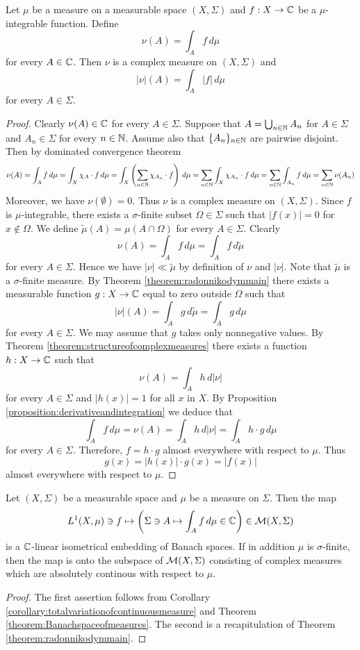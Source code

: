 \begin{corollary}\label{corollary:totalvariationofcontinuousmeasure}
Let $\mu$ be a measure on a measurable space $(X,\Sigma)$ and $f:X\rightarrow {\mathbb C}$ be a $\mu$-integrable function. Define
$$\nu(A) = \int_Af\,d\mu$$
for every $A\in {\mathbb C}$. Then $\nu$ is a complex measure on $(X,\Sigma)$ and
$$|\nu|(A) = \int_A|f|\,d\mu$$
for every $A\in \Sigma$.
\end{corollary}
\begin{proof}
Clearly $\nu(A)\in {\mathbb C}$ for every $A\in \Sigma$. Suppose that $A = \bigcup_{n\in {\mathbb N}}A_n$ for $A\in \Sigma$ and $A_n\in \Sigma$ for every $n\in {\mathbb N}$. Assume also that $\{A_n\}_{n\in {\mathbb N}}$ are pairwise disjoint. Then by dominated convergence theorem
$$\nu(A) = \int_A f\,d\mu = \int_X\chi_A\cdot f\,d\mu = \int_X\left(\sum_{n\in {\mathbb N}}\chi_{A_n}\cdot f\right)\,d\mu = \sum_{n\in {\mathbb N}}\int_X\chi_{A_n}\cdot f\,d\mu = \sum_{n\in {\mathbb N}}\int_{A_n}f\,d\mu = \sum_{n\in {\mathbb N}}\nu(A_n)$$
Moreover, we have $\nu(\emptyset) = 0$. Thus $\nu$ is a complex measure on $(X,\Sigma)$. Since $f$ is $\mu$-integrable, there exists a $\sigma$-finite subset $\Omega\in \Sigma$ such that $|f(x)|= 0$ for $x\not \in \Omega$. We define $\tilde{\mu}(A) = \mu(A\cap \Omega)$ for every $A\in \Sigma$. Clearly
$$\nu(A) = \int_Af\,d\mu = \int_Af\,d\tilde{\mu}$$
for every $A\in \Sigma$. Hence we have $|\nu|\ll\tilde{\mu}$ by definition of $\nu$ and $|\nu|$. Note that $\tilde{\mu}$ is a $\sigma$-finite measure. By Theorem \ref{theorem:radonnikodymmain} there exists a measurable function $g:X\rightarrow {\mathbb C}$ equal to zero outside $\Omega$ such that
$$|\nu|(A) = \int_Ag\,d\tilde{\mu} = \int_Ag\,d\mu$$
for every $A\in \Sigma$. We may assume that $g$ takes only nonnegative values. By Theorem \ref{theorem:structureofcomplexmeasures} there exists a function $h:X\rightarrow {\mathbb C}$ such that
$$\nu(A) = \int_Ah\,d|\nu|$$
for every $A\in \Sigma$ and $|h(x)|=1$ for all $x$ in $X$. By Proposition \ref{proposition:derivativeandintegration} we deduce that
$$\int_Af\,d\mu = \nu(A) = \int_Ah\,d|\nu| = \int_Ah\cdot g\,d\mu$$
for every $A\in \Sigma$. Therefore, $f = h\cdot g$ almost everywhere with respect to $\mu$. Thus
$$g(x) = |h(x)|\cdot g(x) = |f(x)|$$
almost everywhere with respect to $\mu$.
\end{proof}

\begin{corollary}
Let $(X,\Sigma)$ be a measurable space and $\mu$ be a measure on $\Sigma$. Then the map
$$L^1(X,\mu)\ni f\mapsto \left(\Sigma \ni A \mapsto \int_Af\,d\mu\in {\mathbb C}\right)\in {\mathcal M}(X,\Sigma)$$
is a ${\mathbb C}$-linear isometrical embedding of Banach spaces. If in addition $\mu$ is $\sigma$-finite, then the map is onto the subspace of ${\mathcal M}(X,\Sigma)$ consisting of complex measures which are absolutely continous with respect to $\mu$.
\end{corollary}
\begin{proof}
The first assertion follows from Corollary \ref{corollary:totalvariationofcontinuousmeasure} and Theorem \ref{theorem:Banachspaceofmeasures}. The second is a recapitulation of Theorem \ref{theorem:radonnikodymmain}.
\end{proof}


\small




